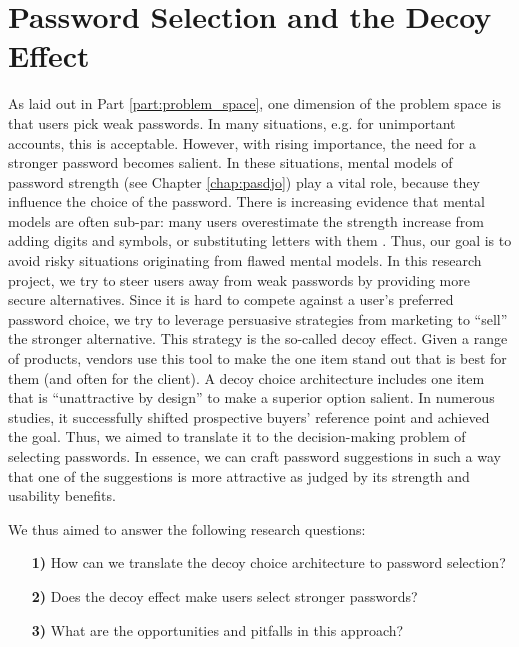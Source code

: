 \chapter[Password Selection and the Decoy Effect]{Password Selection and the Decoy Effect}\label{chap:decoy}

As laid out in Part \ref{part:problem_space}, one dimension of the problem space is that users pick weak passwords. In many situations, e.g. for unimportant accounts, this is acceptable. However, with rising importance, the need for a stronger password becomes salient. In these situations, mental models of password strength (see Chapter \ref{chap:pasdjo}) play a vital role, because they influence the choice of the password. There is increasing evidence that mental models are often sub-par: many users overestimate the strength increase from adding digits and symbols, or substituting letters with them \cite{Seitz2017PASDJO, Ur2015PWCreationLab, Ur2016PerceptionsPassword}. Thus, our goal is to avoid risky situations originating from flawed mental models. In this research project, we try to steer users away from weak passwords by providing more secure alternatives. Since it is hard to compete against a user's preferred password choice, we try to leverage persuasive strategies from marketing to ``sell'' the stronger alternative. This strategy is the so-called decoy effect. Given a range of products, vendors use this tool to make the one item stand out that is best for them (and often for the client). A decoy choice architecture includes one item that is ``unattractive by design'' to make a superior option salient. In numerous studies, it successfully shifted prospective buyers' reference point and achieved the goal. Thus, we aimed to translate it to the decision-making problem of selecting passwords. In essence, we can craft password suggestions in such a way that one of the suggestions is more attractive as judged by its strength and usability benefits. 

We thus aimed to answer the following research questions:

\begin{itemize}
	\item[\textbf{1)}] How can we translate the decoy choice architecture to password selection?	
	\item[\textbf{2)}] Does the decoy effect make users select stronger passwords?
	\item[\textbf{3)}] What are the opportunities and pitfalls in this approach?
\end{itemize}
	
